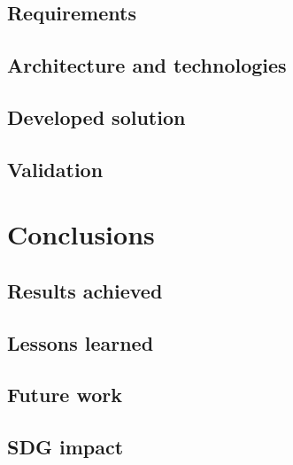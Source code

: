 \documentclass[10pt]{article}
\begin{document}
\subsection{Requirements}



\subsection{Architecture and technologies}



\subsection{Developed solution}



\subsection{Validation}



\section{Conclusions}

\subsection{Results achieved}


\subsection{Lessons learned}


\subsection{Future work}


\subsection{SDG impact}



\end{document}
